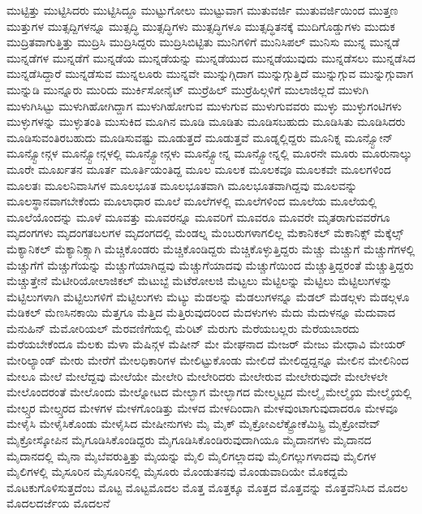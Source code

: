 {ಮುಟ್ಟಿತ್ತು
ಮುಟ್ಟಿಸಿದರು
ಮುಟ್ಟಿಸಿದ್ದೂ
ಮುಟ್ಟುಗೋಲು
ಮುಟ್ಟುವಾಗ
ಮುತುವರ್ಜಿ
ಮುತುವರ್ಜಿಯಿಂದ
ಮುತ್ತಣ
ಮುತ್ತುಗಳ
ಮುತ್ಸದ್ದಿಗಳನ್ನೂ
ಮುತ್ಸದ್ಧಿ
ಮುತ್ಸದ್ಧಿಗಳು
ಮುತ್ಸದ್ಧಿಗಳೂ
ಮುತ್ಸದ್ಧಿತನಕ್ಕೆ
ಮುದಿಗೊಡ್ಡುಗಳು
ಮುದುಕ
ಮುದ್ರಿತವಾಗುತ್ತಿತ್ತು
ಮುದ್ರಿಸಿ
ಮುದ್ರಿಸಿದ್ದರು
ಮುದ್ರಿಸಿಬಿಟ್ಟಿತು
ಮುನಿಗಳಿಗೆ
ಮುನಿಸಿಪಲ್
ಮುನಿಸು
ಮುನ್ನ
ಮುನ್ನಡೆ
ಮುನ್ನಡೆಗಳ
ಮುನ್ನಡೆಗೆ
ಮುನ್ನಡೆಯ
ಮುನ್ನಡೆಯನ್ನು
ಮುನ್ನಡೆಯುದ
ಮುನ್ನಡೆಯುವುದು
ಮುನ್ನಡೆಸಲು
ಮುನ್ನಡೆಸಿದ
ಮುನ್ನಡೆಸಿದ್ದಾರೆ
ಮುನ್ನಡೆಸುವ
ಮುನ್ನಲೂರು
ಮುನ್ನವೇ
ಮುನ್ನುಗ್ಗಿದಾಗ
ಮುನ್ನುಗ್ಗುತ್ತಿದೆ
ಮುನ್ನುಗ್ಗುವ
ಮುನ್ನುಗ್ಗುವಾಗ
ಮುನ್ನುಡಿ
ಮುನ್ನೂರು
ಮುರಿದು
ಮುರ್ಕಿಸೋನೈಟ್
ಮುರ್ರೆಹಿಲ್
ಮುರ್ರೆಹಿಲ್ಗಳಿಗೆ
ಮುಲಾಜಿಲ್ಲದೆ
ಮುಳುಗಿ
ಮುಳುಗಿಸಿಟ್ಟು
ಮುಳುಗಿಹೋಗಿದ್ದಾಗ
ಮುಳುಗಿಹೋಗುವ
ಮುಳುಗುವ
ಮುಳುಗುವವರು
ಮುಳ್ಳು
ಮುಳ್ಳುಗಂಟಿಗಳು
ಮುಳ್ಳುಗಳನ್ನು
ಮುಳ್ಳುತಂತಿ
ಮುಸುಕಿದ
ಮೂಗಿನ
ಮೂಡಿ
ಮೂಡಿತು
ಮೂಡಿಸಬಹುದು
ಮೂಡಿಸಿತು
ಮೂಡಿಸಿದರು
ಮೂಡಿಸುವಂತಿರಬಹುದು
ಮೂಡಿಸುವಷ್ಟು
ಮೂಡುತ್ತದೆ
ಮೂಡುತ್ತವೆ
ಮೂಡ್ನಲ್ಲಿದ್ದರು
ಮೂನಿಕ್ನ
ಮೂನ್ಸ್ಟೋನ್
ಮೂನ್ಸ್ಟೋನ್ಗಳ
ಮೂನ್ಸ್ಟೋನ್ಗಳಲ್ಲಿ
ಮೂನ್ಸ್ಟೋನ್ಗಳು
ಮೂನ್ಸ್ಟೋನ್ನ
ಮೂನ್ಸ್ಟೋನ್ನಲ್ಲಿ
ಮೂರನೇ
ಮೂರು
ಮೂರುನಾಲ್ಕು
ಮೂರೇ
ಮೂರ್ಖತನ
ಮೂರ್ತ
ಮೂರ್ತಿಯಂತಿದ್ದ
ಮೂಲ
ಮೂಲಕ
ಮೂಲಕವೂ
ಮೂಲಕವೇ
ಮೂಲಗಳಿಂದ
ಮೂಲತಃ
ಮೂಲನಿವಾಸಿಗಳ
ಮೂಲಭೂತ
ಮೂಲಭೂತವಾಗಿ
ಮೂಲಭೂತವಾಗಿದ್ದವು
ಮೂಲವನ್ನು
ಮೂಲಸ್ಥಾನವಾಗಬೇಕೆಂದು
ಮೂಲಾಧಾರ
ಮೂಲೆ
ಮೂಲೆಗಳಲ್ಲಿ
ಮೂಲೆಗಳಿಂದ
ಮೂಲೆಯ
ಮೂಲೆಯಲ್ಲಿ
ಮೂಲೆಯೊಂದನ್ನು
ಮೂಳೆ
ಮೂವತ್ತು
ಮೂವರನ್ನೂ
ಮೂವರಿಗೆ
ಮೂವರೂ
ಮೂವರೇ
ಮೃತರಾಗುವವರೆಗೂ
ಮೃದಂಗಗಳು
ಮೃದಂಗತಬಲಗಳ
ಮೃದಂಗದಲ್ಲಿ
ಮೆಂಡಲ್ನ
ಮೆಂಬರುಗಳಾಗಲಿಲ್ಲ
ಮೆಕಾನಿಕಲ್
ಮೆಕಾನಿಕ್ಸ್
ಮೆಕ್ಕೆಲ್ಸ್
ಮೆಕ್ಯಾನಿಕಲ್
ಮೆಕ್ಯಾನಿಕ್ಸ್ಗಾಗಿ
ಮೆಚ್ಚಿಕೊಂಡರು
ಮೆಚ್ಚಿಕೊಂಡಿದ್ದರು
ಮೆಚ್ಚಿಕೊಳ್ಳುತ್ತಿದ್ದರು
ಮೆಚ್ಚು
ಮೆಚ್ಚುಗೆ
ಮೆಚ್ಚುಗೆಗಳಲ್ಲಿ
ಮೆಚ್ಚುಗೆಗೆ
ಮೆಚ್ಚುಗೆಯನ್ನು
ಮೆಚ್ಚುಗೆಯಾಗಿದ್ದವು
ಮೆಚ್ಚುಗೆಯಾದವು
ಮೆಚ್ಚುಗೆಯಿಂದ
ಮೆಚ್ಚುತ್ತಿದ್ದರಂತೆ
ಮೆಚ್ಚುತ್ತಿದ್ದರು
ಮೆಚ್ಚುತ್ತೇನೆ
ಮೆಟೀರಿಯೋಲಾಜಿಕಲ್
ಮೆಟುಬ್ಟೆ
ಮೆಟೆರೋಲಜಿ
ಮೆಟ್ಟಲು
ಮೆಟ್ಟಿಲನ್ನು
ಮೆಟ್ಟಿಲು
ಮೆಟ್ಟಿಲುಗಳನ್ನು
ಮೆಟ್ಟಿಲುಗಳಾಗಿ
ಮೆಟ್ಟಿಲುಗಳಿಗೆ
ಮೆಟ್ಟಿಲುಗಳು
ಮೆಟ್ಯು
ಮೆಡಲನ್ನು
ಮೆಡಲುಗಳನ್ನೂ
ಮೆಡಲ್
ಮೆಡಲ್ಗಳು
ಮೆಡಲ್ಗಳೂ
ಮೆಡಿಕಲ್
ಮೆಣಸಿನಕಾಯಿ
ಮೆತ್ತಗೂ
ಮೆತ್ತಿದ
ಮೆತ್ತಿರುವುದರಿಂದ
ಮೆದಳುಗಳು
ಮೆದು
ಮೆದುಳನ್ನೂ
ಮೆದುವಾದ
ಮೆನುಹಿನ್
ಮೆಮೋರಿಯಲ್
ಮೆರವಣಿಗೆಯಲ್ಲಿ
ಮೆರಿಟ್
ಮೆರುಗು
ಮೆರೆಯಬಲ್ಲರು
ಮೆರೆಯಬಾರದು
ಮೆರೆಯಬೇಕೆಂದೂ
ಮೆಲಕು
ಮೆಳಾ
ಮೆಷಿನ್ಗಳ
ಮೆಷೀನ್
ಮೇ
ಮೇಘನಾದ
ಮೇಜರ್
ಮೇಜು
ಮೇಧಾವಿ
ಮೇಯರ್
ಮೇರಿಲ್ಯಾಂಡ್
ಮೇರು
ಮೇರೆಗೆ
ಮೇಲಧಿಕಾರಿಗಳ
ಮೇಲಿಟ್ಟುಕೊಂಡು
ಮೇಲಿದೆ
ಮೇಲಿದ್ದದ್ದನ್ನೂ
ಮೇಲಿನ
ಮೇಲಿನಿಂದ
ಮೇಲೂ
ಮೇಲೆ
ಮೇಲೆದ್ದವು
ಮೇಲೆಯೇ
ಮೇಲೇರಿ
ಮೇಲೇರಿದರು
ಮೇಲೇರುವ
ಮೇಲೇರುವುದೇ
ಮೇಲೇಳಲೇ
ಮೇಲೊಂದರಂತೆ
ಮೇಲೊಂದು
ಮೇಲ್ನೋಟದ
ಮೇಲ್ಭಾಗ
ಮೇಲ್ಭಾಗದ
ಮೇಲ್ಮಟ್ಟದ
ಮೇಲ್ಮೈ
ಮೇಲ್ಮೈಯ
ಮೇಲ್ಮೈಯಲ್ಲಿ
ಮೇಲ್ಸ್ತರ
ಮೇಲ್ಸ್ತರದ
ಮೇಳಗಳ
ಮೇಳಗೊಂಡಿತ್ತು
ಮೇಳದ
ಮೇಳದಿಂದಾಗಿ
ಮೇಳವುಂಟಾಗುವುದಾದರೂ
ಮೇಳವೂ
ಮೇಳೈಸಿ
ಮೇಳೈಸಿಕೊಂಡು
ಮೇಳೈಸಿದ
ಮೇಷೀನುಗಳು
ಮೈ
ಮೈಕ್
ಮೈಕ್ರೋಎಲೆಕ್ಟ್ರೋಕೆಮಿಸ್ಟ್ರಿ
ಮೈಕ್ರೋವೇವ್
ಮೈಕ್ರೋಸ್ಕೋಪಿನ
ಮೈಗೂಡಿಸಿಕೊಂಡಿದ್ದರು
ಮೈಗೂಡಿಸಿಕೊಂಡಿರುವುದಾಗಿಯೂ
ಮೈದಾನಗಳು
ಮೈದಾನದ
ಮೈದಾನದಲ್ಲಿ
ಮೈನಾ
ಮೈಬೆವರುತ್ತಿತ್ತು
ಮೈಯನ್ನು
ಮೈಲಿ
ಮೈಲಿಗಲ್ಲಾದವು
ಮೈಲಿಗಲ್ಲುಗಳಾದವು
ಮೈಲಿಗಳ
ಮೈಲಿಗಳಲ್ಲಿ
ಮೈಸೂರಿನ
ಮೈಸೂರಿನಲ್ಲಿ
ಮೈಸೂರು
ಮೊಂಡುತನವು
ಮೊಂಡುವಾದಿಯೇ
ಮೊಕದ್ದಮೆ
ಮೊಟಕುಗೊಳಿಸುತ್ತದೆಂಬ
ಮೊಟ್ಟ
ಮೊಟ್ಟಮೊದಲ
ಮೊತ್ತ
ಮೊತ್ತಕ್ಕೂ
ಮೊತ್ತದ
ಮೊತ್ತವನ್ನು
ಮೊತ್ತವೆನಿಸಿದ
ಮೊದಲ
ಮೊದಲದರ್ಜೆಯ
ಮೊದಲನೆ
}

